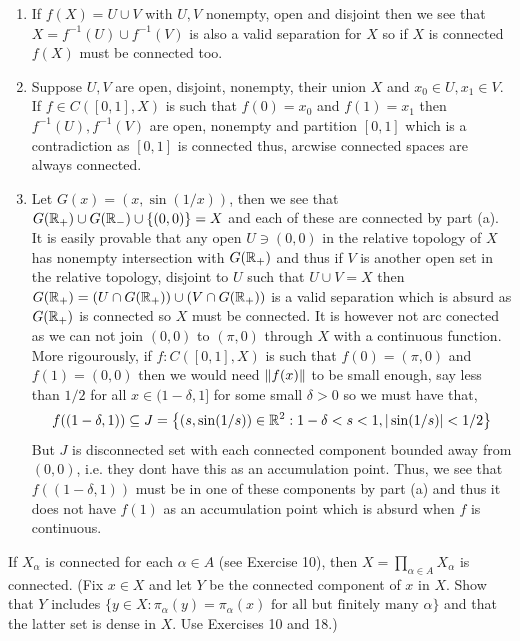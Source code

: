 \documentclass[12pt,a4paper]{article}
\begin{document}
\begin{solution}
\begin{enumerate}[label=\alph*.]
    \item If $f(X)=U\cup V$ with $U,V$ nonempty, open and disjoint then we see that $X=f^{-1}(U)\cup f^{-1}(V)$ is also a valid separation for $X$ so if $X$ is connected $f(X)$ must be connected too. 
    \item Suppose $U,V$ are open, disjoint, nonempty, their union $X$ and $x_0\in U,x_1\in V$. 
        If $f\in C([0,1],X)$ is such that $f(0)=x_0$ and $f(1)=x_1$ then $f^{-1}(U),f^{-1}(V)$ are open, nonempty and partition $[0,1]$ which is a contradiction as $[0,1]$ is connected thus, arcwise connected spaces are always connected. 
    \item Let $G(x)=(x,\sin(1/x))$, then we see that $G(\mathbb{R}_+)\cup G(\mathbb{R}_-)\cup \qty{(0,0)}=X$ and each of these are connected by part (a). 
        It is easily provable that any open $U\ni (0,0)$ in the relative topology of $X$ has nonempty intersection with $G(\mathbb{R}_+)$ and thus if $V$ is another open set in the relative topology,  disjoint to $U$ such that $U\cup V=X$ then $G(\mathbb{R}_+)=(U\cap G(\mathbb{R}_+))\cup(V\cap G(\mathbb{R}_+))$ is a valid separation which is absurd as $G(\mathbb{R}_+)$ is connected so $X$ must be connected. 
        It is however not arc conected as we can not join $(0,0)$ to $(\pi,0)$ through $X$ with a continuous function. 
        More rigourously, if $f:C([0,1],X)$ is such that $f(0)=(\pi,0)$ and $f(1)=(0,0)$ then we would need $\norm{f(x)}$ to be small enough, say less than $1/2$ for all $x\in(1-\delta,1]$ for some small $\delta>0$ so we must have that,
        \[
            f((1-\delta,1))\subseteq J=\qty{(s,\sin(1/s))\in\mathbb{R}^2:1-\delta<s<1,|\sin(1/s)|<1/2}
        \]
        But $J$ is disconnected set with each connected component bounded away from $(0,0)$, i.e. they dont have this as an accumulation point. 
        Thus, we see that $f((1-\delta,1))$ must be in one of these components by part (a) and thus it does not have $f(1)$ as an accumulation point which is absurd when $f$ is continuous. 
\end{enumerate}
\end{solution}
\begin{problem}\label{prob:4-27}
If $X_\alpha$ is connected for each $\alpha \in A$ (see Exercise 10), then $X = \prod_{\alpha \in A} X_\alpha$ is connected. (Fix $x \in X$ and let $Y$ be the connected component of $x$ in $X$. Show that $Y$ includes $\{y \in X : \pi_\alpha(y) = \pi_\alpha(x) \text{ for all but finitely many } \alpha\}$ and that the latter set is dense in $X$. Use Exercises 10 and 18.)
\end{problem}
\end{document}
